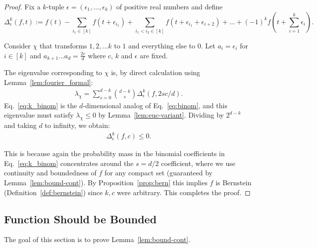 \begin{proof}
Fix a $k$-tuple $\epsilon=(\epsilon_1,\dots,\epsilon_k)$ of positive real numbers and define
\[ 
\Delta_{\epsilon}^k (f, t) := f(t) - \sum_{i_1\in [k]} f(t+\epsilon_{i_1})
    + \sum_{i_1<i_2\in [k]} f(t+\epsilon_{i_1}+\epsilon_{i+2})  +
    \ldots + (-1)^k f\left(t+\sum_{i=1}^k \epsilon_i\right). 
    \]

Consider $\chi$ that transforms $1, 2, \ldots k$ to $1$ and everything else
    to $0$. 
    Let $a_i= \epsilon_i$ for $ i \in [k]  $ and $a_{k+1} \ldots a_d =
    \frac{2c}{d}$ where $c$, $k$ and $\epsilon$ are fixed.
    
The eigenvalue corresponding to $\chi$ is, by direct
calculation using Lemma~\ref{lem:fourier_formal}:
\begin{align}\label{eq:k_binom}
\lambda_{\chi}=\sum_{s = 0}^{d-k} \binom{d-k}{s} \Delta_\epsilon^k(f, 2sc/d).
\end{align}
Eq.~\eqref{eq:k_binom} is the $d$-dimensional analog of Eq.~\eqref{eq:binom}, and this eigenvalue must satisfy $\lambda_{\chi}\leq 0$ by Lemma~\ref{lem:euc-variant}.  
Dividing by $2^{d-k}$ and taking $d$ to infinity, we obtain:
\begin{align*}
\Delta_{\epsilon}^k(f, c)\leq 0. 
\end{align*}

This is because again the probability mass in the binomial coefficients
in Eq.~\eqref{eq:k_binom} concentrates around the
$s=d/2$ coefficient, where we use continuity and boundedness of
$f$ for any compact set (guaranteed by Lemma~\ref{lem:bound-cont}). By Proposition~\ref{prop:bern} this implies $f$ is Bernstein (Definition~\ref{def:bernstein}) since $k,c$ were arbitrary. This completes the proof.
  \end{proof}
















\subsection{Function Should be Bounded}\label{sec:manhattan_transform12:boundcont}
  The goal of this section is to prove Lemma~\ref{lem:bound-cont}.
  
  
  
